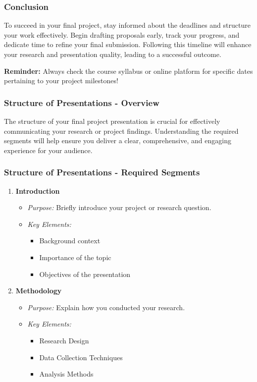 \documentclass[aspectratio=169]{beamer}
\begin{document}
\begin{frame}[fragile]
    \frametitle{Conclusion}
    To succeed in your final project, stay informed about the deadlines and structure your work effectively. Begin drafting proposals early, track your progress, and dedicate time to refine your final submission. Following this timeline will enhance your research and presentation quality, leading to a successful outcome.

    \textbf{Reminder:} Always check the course syllabus or online platform for specific dates pertaining to your project milestones!
\end{frame}

\begin{frame}[fragile]
    \frametitle{Structure of Presentations - Overview}
    The structure of your final project presentation is crucial for effectively communicating your research or project findings. Understanding the required segments will help ensure you deliver a clear, comprehensive, and engaging experience for your audience.
\end{frame}

\begin{frame}[fragile]
    \frametitle{Structure of Presentations - Required Segments}
    \begin{enumerate}
        \item \textbf{Introduction}
            \begin{itemize}
                \item \textit{Purpose:} Briefly introduce your project or research question.
                \item \textit{Key Elements:}
                    \begin{itemize}
                        \item Background context
                        \item Importance of the topic
                        \item Objectives of the presentation
                    \end{itemize}
            \end{itemize}

        \item \textbf{Methodology}
            \begin{itemize}
                \item \textit{Purpose:} Explain how you conducted your research.
                \item \textit{Key Elements:}
                    \begin{itemize}
                        \item Research Design
                        \item Data Collection Techniques
                        \item Analysis Methods
                    \end{itemize}
            \end{itemize}
    \end{enumerate}
\end{frame}
\end{document}
